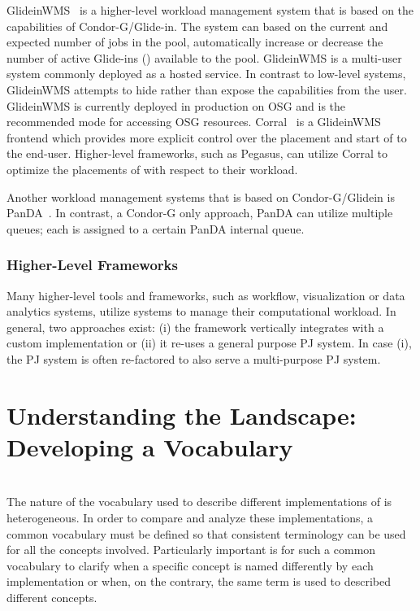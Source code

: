 \documentclass{sig-alternate}
\begin{document}
GlideinWMS~\cite{1742-6596-119-6-062044} is a higher-level workload management
system that is based on the \pilot capabilities of Condor-G/Glide-in. The
system can based on the current and expected number of jobs in the pool,
automatically increase or decrease the number of active Glide-ins (\pilots)
available to the pool. GlideinWMS is a multi-user \pilotjob system commonly
deployed as a hosted service. In contrast to low-level \pilotjob systems,
GlideinWMS attempts to hide rather than expose the \pilot capabilities from
the user. GlideinWMS is currently deployed in production on OSG and is the
recommended mode for accessing OSG resources.
Corral~\cite{Rynge:2011:EUG:2116259.2116599} is a GlideinWMS frontend which
provides more explicit control over the placement and start of \pilots to the
end-user. Higher-level frameworks, such as Pegasus, can utilize Corral to
optimize the placements of \pilots with respect to their workload.

Another workload management systems that is based on Condor-G/Glidein is
PanDA~\cite{1742-6596-331-7-072069}. In contrast, a Condor-G only approach,
PanDA can utilize multiple queues; each \pilot is assigned to a certain PanDA
internal queue.

\subsubsection{Higher-Level Frameworks}

Many higher-level tools and frameworks, such as workflow, visualization or
data analytics systems, utilize \pilotjob systems to manage their
computational workload. In general, two approaches exist: (i) the framework
vertically integrates with a custom \pilotjob implementation or (ii) it
re-uses a general purpose PJ system. In case (i), the PJ system is often
re-factored to also serve a multi-purpose PJ system.


\section{Understanding the Landscape: Developing a Vocabulary}
\label{sec:vocab}

 \\
The nature of the vocabulary used to describe different implementations of  \pilotjobs is heterogeneous. In order to compare and analyze these implementations, a common vocabulary must be defined so that consistent terminology can be used for all the concepts involved. Particularly important is for such a common vocabulary to clarify when a specific concept is named differently by each implementation or when, on the contrary, the same term is used to described different concepts. 
\end{document}

